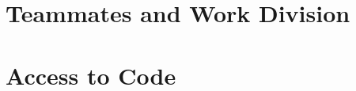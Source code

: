 \documentclass{article}
\begin{document}



\section{Teammates and Work Division}


\section{Access to Code}
\end{document}
